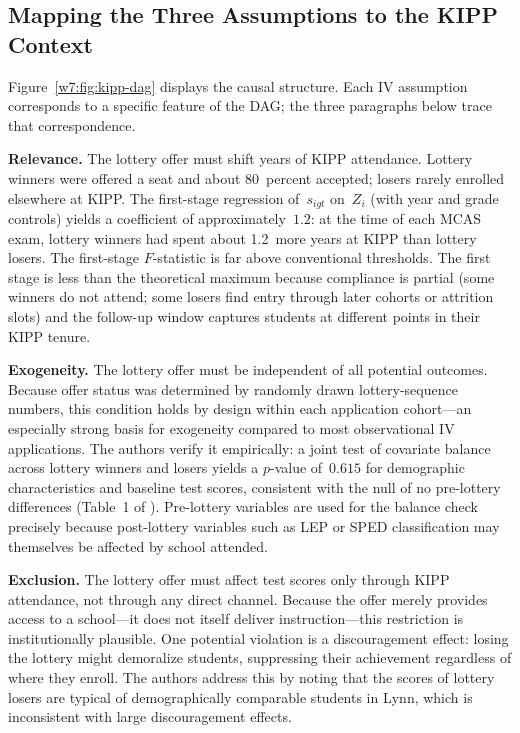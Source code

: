 \documentclass[master.tex]{subfiles}
\begin{document}
\subsection{Mapping the Three Assumptions to the KIPP Context}

Figure~\ref{w7:fig:kipp-dag} displays the causal structure.  Each
IV assumption corresponds to a specific feature of the DAG; the
three paragraphs below trace that correspondence.

\textbf{Relevance.}  The lottery offer must shift years of KIPP
attendance.  Lottery winners were offered a seat and about 80~percent
accepted; losers rarely enrolled elsewhere at KIPP.  The first-stage
regression of~$s_{igt}$ on~$Z_i$ (with year and grade controls) yields
a coefficient of approximately~$1.2$: at the time of each MCAS exam,
lottery winners had spent about 1.2~more years at KIPP than lottery
losers.  The first-stage $F$-statistic is far above conventional
thresholds.  The first stage is less than the theoretical maximum
because compliance is partial (some winners do not attend; some
losers find entry through later cohorts or attrition slots) and the
follow-up window captures students at different points in their KIPP
tenure.

\textbf{Exogeneity.}  The lottery offer must be independent of all
potential outcomes.  Because offer status was determined by randomly
drawn lottery-sequence numbers, this condition holds by design within
each application cohort---an especially strong basis for exogeneity
compared to most observational IV applications.  The authors verify it
empirically: a joint test of covariate balance across lottery winners
and losers yields a $p$-value of~$0.615$ for demographic
characteristics and baseline test scores, consistent with the null of
no pre-lottery differences (Table~1 of \citealt{angrist2012benefits}).
Pre-lottery variables are used for the balance check precisely because
post-lottery variables such as LEP or SPED classification may
themselves be affected by school attended.

\textbf{Exclusion.}  The lottery offer must affect test scores only
through KIPP attendance, not through any direct channel.  Because the
offer merely provides access to a school---it does not itself deliver
instruction---this restriction is institutionally plausible.  One
potential violation is a discouragement effect: losing the lottery
might demoralize students, suppressing their achievement regardless of
where they enroll.  The authors address this by noting that the scores
of lottery losers are typical of demographically comparable students in
Lynn, which is inconsistent with large discouragement effects.
\end{document}
